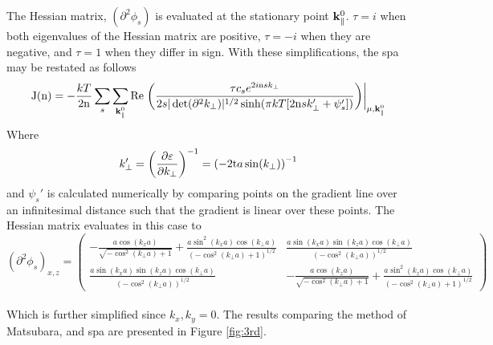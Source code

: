 \documentclass[a4paper, 12pt]{article}
\begin{document}
	The Hessian matrix, $(\partial^2 \phi_s)$ is evaluated at the stationary point $\rm \bf k_\parallel^{\rm 0}$.
	$\tau=i$ when both eigenvalues of the Hessian matrix are positive, $\tau=-i$ when they are negative, and $\tau=1$ when they differ in sign.
	With these simplifications, the \gls{spa} may be restated as follows
\begin{equation}\label{SPA_2}
	{\rm J(n)} = -\frac{kT}{2{\rm n}}\sum_s \sum_{{\bf k}_\parallel^0}{\rm Re}\left.\left(\frac{\tau c_se^{2i{\rm n}sk_\perp}}{2s\vert \det(\partial^2k_\perp)\vert^{1/2}\sinh(\pi kT[2{\rm n}sk_\perp '+\psi_s '])} \right) \right\vert_{\mu , {\bf k}_\parallel^0}
\end{equation}
Where
\begin{equation}
	k_\perp' = \left(\frac{\partial\varepsilon}{\partial k_\perp}\right)^{-1}=\left(-2{\rm t} a\sin(k_\perp)\right)^{-1}
\end{equation}
and $\psi_s'$ is calculated numerically by comparing points on the gradient line over an infinitesimal distance such that the gradient is linear over these points.
The Hessian matrix evaluates in this case to
\\[3mm]
\begin{equation}
	(\partial^2\phi_s)_{x, z}=\begin{pmatrix} -\frac{a\cos(k_x a)}{\sqrt{-\cos^2(k_\perp a)+1}}+\frac{a\sin^2(k_x a)\cos(k_\perp a)}{(-\cos^2(k_\perp a)+1)^{1/2}}&\frac{a\sin(k_x a)\sin(k_z a)\cos(k_\perp a)}{(-\cos^2(k_\perp a))^{1/2}}\\\frac{a\sin(k_x a)\sin(k_z a)\cos(k_\perp a)}{(-\cos^2(k_\perp a))^{1/2}}&-\frac{a\cos(k_z a)}{\sqrt{-\cos^2(k_\perp a)+1}}+\frac{a\sin^2(k_z a)\cos(k_\perp a)}{(-\cos^2(k_\perp a)+1)^{1/2}} \end{pmatrix}
\end{equation}
\normalsize
\\[5mm]
Which is further simplified since $k_x, k_y = 0$. The results comparing the method of Matsubara, and \gls{spa} are presented in Figure \ref{fig:3rd}.
\\ [5mm]
\end{document}
